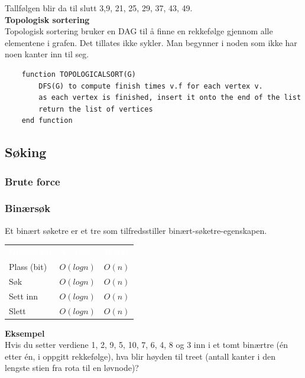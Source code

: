 \noindent Tallfølgen blir da til slutt 3,9, 21, 25, 29, 37, 43, 49.\\

\noindent \textbf{Topologisk sortering}\\
Topologisk sortering bruker en DAG til å finne en rekkefølge gjennom alle elementene i grafen. Det tillates ikke sykler. Man begynner i noden som ikke har noen kanter inn til seg.

\begin{lstlisting}
    function TOPOLOGICALSORT(G)
    	DFS(G) to compute finish times v.f for each vertex v.
    	as each vertex is finished, insert it onto the end of the list
    	return the list of vertices
    end function

\end{lstlisting}


\subsection{Søking}

\subsubsection{Brute force}

\subsubsection{Binærsøk}
Et binært søketre er et tre som tilfredsstiller binært-søketre-egenskapen.

\begin{table}[H]
    \label{tab:binaert}
    \centering
    \begin{tabular}{|L{10em} | L{10em}| L{10em}|}
        \hline
        \textbf{\textcolor{white}{Operasjon}} & \textbf{\textcolor{white}{Average}} & \textbf{\textcolor{white}{Worst}}\\
        Plass (bit) & $O(log n)$ & $O(n)$\\
        Søk & $O(log n)$ & $O(n)$ \\
        Sett inn & $O(log n)$ & $O(n)$ \\
        Slett & $O(log n)$ & $O(n)$ \\
         \hline
    \end{tabular}
\end{table}

\noindent \textbf{Eksempel}\\
Hvis du setter verdiene 1, 2, 9, 5, 10, 7, 6, 4, 8 og 3 inn i et tomt binærtre (én etter én, i oppgitt rekkefølge), hva blir høyden til treet (antall kanter i den lengste stien fra rota til en løvnode)?

